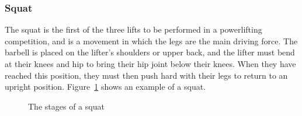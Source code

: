 \subsubsection{Squat}

The squat is the first of the three lifts to be performed in a powerlifting competition, and is a movement in which the legs are the main driving force. The barbell is placed on the lifter’s shoulders or upper back, and the lifter must bend at their knees and hip to bring their hip joint below their knees. When they have reached this position, they must then push hard with their legs to return to an upright position. Figure~\ref{fig:squat_stages} shows an example of a squat.

\begin{figure}[H]
    \centering
\caption{The stages of a squat}
\label{fig:squat_stages}
\end{figure}

